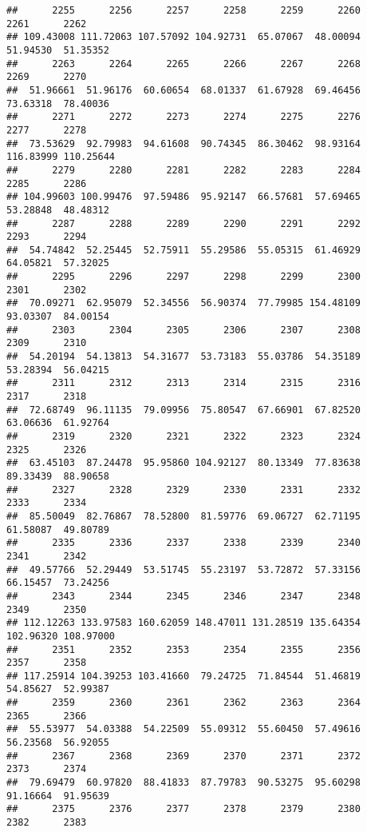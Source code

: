 \documentclass[
]{article}
\begin{document}
\begin{verbatim}
##      2255      2256      2257      2258      2259      2260      2261      2262 
## 109.43008 111.72063 107.57092 104.92731  65.07067  48.00094  51.94530  51.35352 
##      2263      2264      2265      2266      2267      2268      2269      2270 
##  51.96661  51.96176  60.60654  68.01337  61.67928  69.46456  73.63318  78.40036 
##      2271      2272      2273      2274      2275      2276      2277      2278 
##  73.53629  92.79983  94.61608  90.74345  86.30462  98.93164 116.83999 110.25644 
##      2279      2280      2281      2282      2283      2284      2285      2286 
## 104.99603 100.99476  97.59486  95.92147  66.57681  57.69465  53.28848  48.48312 
##      2287      2288      2289      2290      2291      2292      2293      2294 
##  54.74842  52.25445  52.75911  55.29586  55.05315  61.46929  64.05821  57.32025 
##      2295      2296      2297      2298      2299      2300      2301      2302 
##  70.09271  62.95079  52.34556  56.90374  77.79985 154.48109  93.03307  84.00154 
##      2303      2304      2305      2306      2307      2308      2309      2310 
##  54.20194  54.13813  54.31677  53.73183  55.03786  54.35189  53.28394  56.04215 
##      2311      2312      2313      2314      2315      2316      2317      2318 
##  72.68749  96.11135  79.09956  75.80547  67.66901  67.82520  63.06636  61.92764 
##      2319      2320      2321      2322      2323      2324      2325      2326 
##  63.45103  87.24478  95.95860 104.92127  80.13349  77.83638  89.33439  88.90658 
##      2327      2328      2329      2330      2331      2332      2333      2334 
##  85.50049  82.76867  78.52800  81.59776  69.06727  62.71195  61.58087  49.80789 
##      2335      2336      2337      2338      2339      2340      2341      2342 
##  49.57766  52.29449  53.51745  55.23197  53.72872  57.33156  66.15457  73.24256 
##      2343      2344      2345      2346      2347      2348      2349      2350 
## 112.12263 133.97583 160.62059 148.47011 131.28519 135.64354 102.96320 108.97000 
##      2351      2352      2353      2354      2355      2356      2357      2358 
## 117.25914 104.39253 103.41660  79.24725  71.84544  51.46819  54.85627  52.99387 
##      2359      2360      2361      2362      2363      2364      2365      2366 
##  55.53977  54.03388  54.22509  55.09312  55.60450  57.49616  56.23568  56.92055 
##      2367      2368      2369      2370      2371      2372      2373      2374 
##  79.69479  60.97820  88.41833  87.79783  90.53275  95.60298  91.16664  91.95639 
##      2375      2376      2377      2378      2379      2380      2382      2383 

\end{verbatim}
\end{document}
